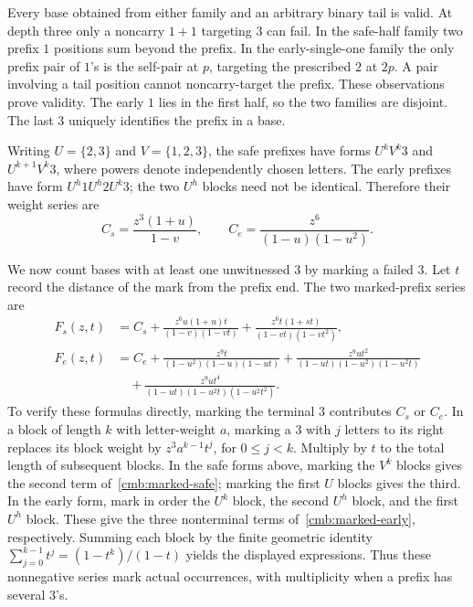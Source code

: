 \documentclass[11pt]{amsart}
\theoremstyle{definition}
\theoremstyle{remark}
\numberwithin{equation}{section}
\begin{document}
Every base obtained from either family and an arbitrary binary tail is
valid. At depth three only a noncarry $1+1$ targeting $3$ can fail. In the
safe-half family two prefix $1$ positions sum beyond the prefix. In the
early-single-one family the only prefix pair of $1$'s is the self-pair at
$p$, targeting the prescribed $2$ at $2p$. A pair involving a tail position
cannot noncarry-target the prefix. These observations prove validity.
The early $1$ lies in the first half, so the two families are disjoint.
The last $3$ uniquely identifies the prefix in a base.

Writing $U=\{2,3\}$ and $V=\{1,2,3\}$, the safe prefixes have forms
$U^kV^k3$ and $U^{k+1}V^k3$, where powers denote independently chosen
letters. The early prefixes have form $U^h1U^h2U^k3$; the two $U^h$ blocks
need not be identical. Therefore their weight series are
\begin{equation}\label{cmb:prefix-series}
 C_s=\frac{z^3(1+u)}{1-v},\qquad
 C_e=\frac{z^6}{(1-u)(1-u^2)}.
\end{equation}

We now count bases with at least one unwitnessed $3$ by marking a failed
$3$. Let $t$ record the distance of the mark from the prefix end. The two
marked-prefix series are
\begin{align}
 F_s(z,t)&=C_s+
 \frac{z^6u(1+u)t}{(1-v)(1-vt)}+
 \frac{z^6t(1+st)}{(1-vt)(1-vt^2)},\label{cmb:marked-safe}\\
 F_e(z,t)&=C_e+
 \frac{z^9t}{(1-u^2)(1-u)(1-ut)}+
 \frac{z^9ut^2}{(1-ut)(1-u^2)(1-u^2t)}
 \nonumber\\
 &\quad+\frac{z^9ut^4}{(1-ut)(1-u^2t)(1-u^2t^2)}.
 \label{cmb:marked-early}
\end{align}
To verify these formulas directly, marking the terminal $3$ contributes
$C_s$ or $C_e$. In a block of length $k$ with letter-weight $a$, marking a
$3$ with $j$ letters to its right replaces its block weight by
$z^3a^{k-1}t^j$, for $0\le j<k$. Multiply by $t$ to the total length of
subsequent blocks. In the safe forms above, marking the $V^k$ blocks gives
the second term of~\eqref{cmb:marked-safe}; marking the first $U$ blocks
gives the third. In the early form, mark in order the $U^k$ block, the
second $U^h$ block, and the first $U^h$ block. These give the three
nonterminal terms of~\eqref{cmb:marked-early}, respectively. Summing each
block by the finite geometric identity
$\sum_{j=0}^{k-1}t^j=(1-t^k)/(1-t)$ yields the displayed expressions.
Thus these nonnegative series mark actual occurrences, with multiplicity
when a prefix has several $3$'s.
\end{document}

